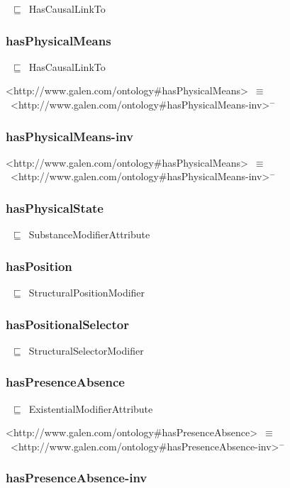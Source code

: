 \documentclass{article}
\begin{document}
~\ensuremath{\sqsubseteq}~HasCausalLinkTo

\subsubsection*{hasPhysicalMeans}

~\ensuremath{\sqsubseteq}~HasCausalLinkTo

<http://www.galen.com/ontology#hasPhysicalMeans>~\ensuremath{\equiv}~<http://www.galen.com/ontology#hasPhysicalMeans-inv>\ensuremath{^-}

\subsubsection*{hasPhysicalMeans-inv}

<http://www.galen.com/ontology#hasPhysicalMeans>~\ensuremath{\equiv}~<http://www.galen.com/ontology#hasPhysicalMeans-inv>\ensuremath{^-}

\subsubsection*{hasPhysicalState}

~\ensuremath{\sqsubseteq}~SubstanceModifierAttribute

\subsubsection*{hasPosition}

~\ensuremath{\sqsubseteq}~StructuralPositionModifier

\subsubsection*{hasPositionalSelector}

~\ensuremath{\sqsubseteq}~StructuralSelectorModifier

\subsubsection*{hasPresenceAbsence}

~\ensuremath{\sqsubseteq}~ExistentialModifierAttribute

<http://www.galen.com/ontology#hasPresenceAbsence>~\ensuremath{\equiv}~<http://www.galen.com/ontology#hasPresenceAbsence-inv>\ensuremath{^-}

\subsubsection*{hasPresenceAbsence-inv}
\end{document}
